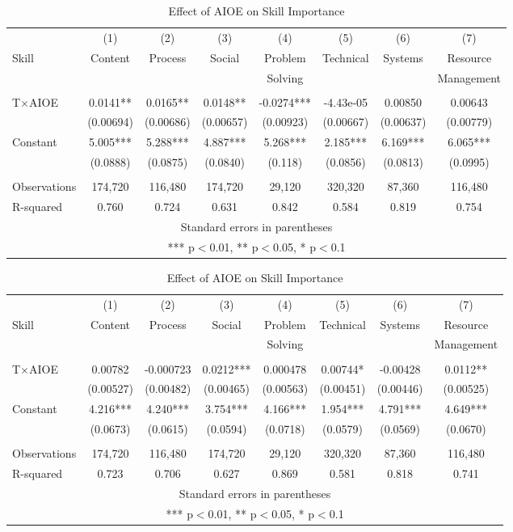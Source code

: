 \documentclass[12pt]{article}
\begin{document}
\begin{table}
\center
\scriptsize
\caption{Effect of AIOE on Skill Level}
\label{estimation3}
\begin{tabular}{lccccccc} \hline \hline
 & (1) & (2) & (3) & (4) & (5) & (6) & (7) \\
Skill & Content & Process & Social & Problem& Technical & Systems & Resource\\ 
 & &  & & Solving &  & & Management \\ \hline
 &  &  &  &  &  &  &  \\
T$\times$AIOE & 0.0141** & 0.0165** & 0.0148** & -0.0274*** & -4.43e-05 & 0.00850 & 0.00643 \\
 & (0.00694) & (0.00686) & (0.00657) & (0.00923) & (0.00667) & (0.00637) & (0.00779) \\
Constant & 5.005*** & 5.288*** & 4.887*** & 5.268*** & 2.185*** & 6.169*** & 6.065*** \\
 & (0.0888) & (0.0875) & (0.0840) & (0.118) & (0.0856) & (0.0813) & (0.0995) \\
 &  &  &  &  &  &  &  \\
Observations & 174,720 & 116,480 & 174,720 & 29,120 & 320,320 & 87,360 & 116,480 \\
 R-squared & 0.760 & 0.724 & 0.631 & 0.842 & 0.584 & 0.819 & 0.754 \\ \hline
\multicolumn{8}{c}{ Standard errors in parentheses} \\
\multicolumn{8}{c}{ *** p$<$0.01, ** p$<$0.05, * p$<$0.1} \\
\end{tabular}

\caption{Effect of AIOE on Skill Importance}
\label{estimation4}
\begin{tabular}{lccccccc} \hline \hline
 & (1) & (2) & (3) & (4) & (5) & (6) & (7) \\
Skill & Content & Process & Social & Problem& Technical & Systems & Resource\\ 
 & &  & & Solving &  & & Management \\ \hline
 &  &  &  &  &  &  &  \\
T$\times$AIOE & 0.00782 & -0.000723 & 0.0212*** & 0.000478 & 0.00744* & -0.00428 & 0.0112** \\
 & (0.00527) & (0.00482) & (0.00465) & (0.00563) & (0.00451) & (0.00446) & (0.00525) \\
Constant & 4.216*** & 4.240*** & 3.754*** & 4.166*** & 1.954*** & 4.791*** & 4.649*** \\
 & (0.0673) & (0.0615) & (0.0594) & (0.0718) & (0.0579) & (0.0569) & (0.0670) \\
 &  &  &  &  &  &  &  \\
Observations & 174,720 & 116,480 & 174,720 & 29,120 & 320,320 & 87,360 & 116,480 \\
 R-squared & 0.723 & 0.706 & 0.627 & 0.869 & 0.581 & 0.818 & 0.741 \\ \hline
\multicolumn{8}{c}{ Standard errors in parentheses} \\
\multicolumn{8}{c}{ *** p$<$0.01, ** p$<$0.05, * p$<$0.1} \\
\end{tabular}
\end{table}
\end{document}
